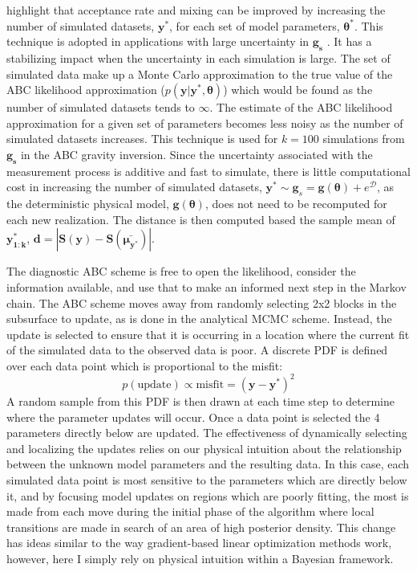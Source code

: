 \citet{Sisson2010a} highlight that acceptance rate and mixing can be improved by increasing the number of simulated datasets, $\bm{y^*}$, for each set of model parameters, $\bm{\theta^*}$. This technique is adopted in applications with large uncertainty in $\bm{g_s}$ \citep{Ratmann2009,Wood2010}. It has a stabilizing impact when the uncertainty in each simulation is large. The set of simulated data make up a Monte Carlo approximation to the true value of the ABC likelihood approximation ($p(\bm{y}|\bm{y^*},\bm{\theta})$) which would be found as the number of simulated datasets tends to $\infty$. The estimate of the ABC likelihood approximation for a given set of parameters becomes less noisy as the number of simulated datasets increases. This technique is used for $k = 100$ simulations from $\bm{g_s}$ in the ABC gravity inversion. Since the uncertainty associated with the measurement process is additive and fast to simulate, there is little computational cost in increasing the number of simulated datasets, $\bm{y^*} \sim \bm{g}_s = \bm{g}(\bm{\theta}) + e^{\mathcal{D}}$, as the deterministic physical model, $\bm{g}(\bm{\theta})$, does not need to be recomputed for each new realization. The distance is then computed based the sample mean of $\bm{y^*_{1:k}}$, $\bm{d} = |\bm{S}(\bm{y})-\bm{S}(\bm{\bar{\mu_{y^*}}})|$. \par

The diagnostic ABC scheme is free to open the likelihood, consider the information available, and use that to make an informed next step in the Markov chain. The ABC scheme moves away from randomly selecting 2x2 blocks in the subsurface to update, as is done in the analytical MCMC scheme. Instead, the update is selected to ensure that it is occurring in a location where the current fit of the simulated data to the observed data is poor. A discrete PDF is defined over each data point which is proportional to the misfit:
\begin{equation}
	p(\text{update}) \propto \text{misfit} = (\bm{y}-\bm{y^*})^2
	\label{misfit}
\end{equation}
A random sample from this PDF is then drawn at each time step to determine where the parameter updates will occur. Once a data point is selected the 4 parameters directly below are updated. The effectiveness of dynamically selecting and localizing the updates relies on our physical intuition about the relationship between the unknown model parameters and the resulting data. In this case, each simulated data point is most sensitive to the parameters which are directly below it, and by focusing model updates on regions which are poorly fitting, the most is made from each move during the initial phase of the algorithm where local transitions are made in search of an area of high posterior density. This change has ideas similar to the way gradient-based linear optimization methods work, however, here I simply rely on physical intuition within a Bayesian framework. \par

